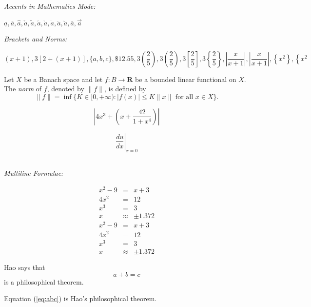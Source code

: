 \documentclass[12pt]{article}
\begin{document}
\noindent
\begin{large}\textit{Accents in Mathematics Mode:}\end{large}

$\underline{a}, \overline{a}, \hat{a}, \check{a}, \tilde{a}, \acute{a}, \grave{a}, \dot{a}, \ddot{a}, \breve{a}, \bar{a}, \vec{a}$ \\

\noindent
\begin{large}\textit{Brackets and Norms:}\end{large}

\[ (x+1), 3[2+(x+1)], \{a, b, c\}, \$12.55, 
   3(\frac{2}{5}), 3\left(\frac{2}{5}\right), 
   3\left[\frac{2}{5}\right],3\left\{\frac{2}{5}\right\},
   |\frac{x}{x+1}|, \left| \frac{x}{x+1} \right|,
   \left\{x^2\right\}, \left\{x^2\right. \]

Let $X$ be a Banach space and let $f \colon B \to \textbf{R}$ be a bounded linear functional on $X$. The \textit{norm} of $f$, denoted by $\|f\|$, is defined by
\[ \|f\| = \inf \{ K \in [0,+\infty) :
			|f(x)| \leq K \|x\| \mbox{ for all } x \in X \}.\]
			
\[ \left| 4 x^3 + \left( x + \frac{42}{1+x^4} \right) \right|\]

\[ \left. \frac{du}{dx} \right|_{x = 0}\] \\

\noindent
\begin{large}\textit{Multiline Formulae:}\end{large}

\begin{eqnarray}
x^2 - 9 & = & x + 3 \\
4x^2 & = & 12 \\
x^3 & = & 3 \\
x & \approx & \pm 1.372
\end{eqnarray}
\begin{eqnarray*}
x^2 - 9 & = & x + 3 \\
4x^2 & = & 12 \\
x^3 & = & 3 \\
x & \approx & \pm 1.372
\end{eqnarray*}

Hao says that
\begin{equation}
a+b=c
\label{eq:abc}
\end{equation}
is a philosophical theorem.

Equation (\ref{eq:abc}) is Hao's philosophical theorem. \\
\end{document}

